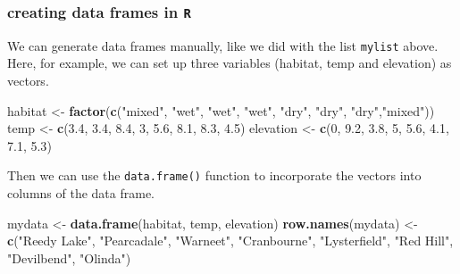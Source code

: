 \documentclass[]{book}
\newenvironment{Shaded}{\begin{snugshade}}{\end{snugshade}}
\newcommand{\DecValTok}[1]{\textcolor[rgb]{0.00,0.00,0.81}{#1}}
\newcommand{\FloatTok}[1]{\textcolor[rgb]{0.00,0.00,0.81}{#1}}
\newcommand{\KeywordTok}[1]{\textcolor[rgb]{0.13,0.29,0.53}{\textbf{#1}}}
\newcommand{\NormalTok}[1]{#1}
\newcommand{\StringTok}[1]{\textcolor[rgb]{0.31,0.60,0.02}{#1}}
\begin{document}
\hypertarget{creating-data-frames-in-r}{%
\subsubsection{\texorpdfstring{creating data frames in \texttt{R}}{creating data frames in R}}\label{creating-data-frames-in-r}}

We can generate data frames manually, like we did with the list \texttt{mylist} above. Here, for example, we can set up three variables (habitat, temp and elevation) as vectors.

\begin{Shaded}
\begin{Highlighting}[]
\NormalTok{habitat <-}\StringTok{ }\KeywordTok{factor}\NormalTok{(}\KeywordTok{c}\NormalTok{(}\StringTok{"mixed"}\NormalTok{, }\StringTok{"wet"}\NormalTok{, }\StringTok{"wet"}\NormalTok{, }\StringTok{"wet"}\NormalTok{, }\StringTok{"dry"}\NormalTok{, }\StringTok{"dry"}\NormalTok{, }\StringTok{"dry"}\NormalTok{,}\StringTok{"mixed"}\NormalTok{))}
\NormalTok{temp <-}\StringTok{ }\KeywordTok{c}\NormalTok{(}\FloatTok{3.4}\NormalTok{, }\FloatTok{3.4}\NormalTok{, }\FloatTok{8.4}\NormalTok{, }\DecValTok{3}\NormalTok{, }\FloatTok{5.6}\NormalTok{, }\FloatTok{8.1}\NormalTok{, }\FloatTok{8.3}\NormalTok{, }\FloatTok{4.5}\NormalTok{)}
\NormalTok{elevation <-}\StringTok{ }\KeywordTok{c}\NormalTok{(}\DecValTok{0}\NormalTok{, }\FloatTok{9.2}\NormalTok{, }\FloatTok{3.8}\NormalTok{, }\DecValTok{5}\NormalTok{, }\FloatTok{5.6}\NormalTok{, }\FloatTok{4.1}\NormalTok{, }\FloatTok{7.1}\NormalTok{, }\FloatTok{5.3}\NormalTok{)}
\end{Highlighting}
\end{Shaded}

Then we can use the \texttt{data.frame()} function to incorporate the vectors into columns of the data frame.

\begin{Shaded}
\begin{Highlighting}[]
\NormalTok{mydata <-}\StringTok{ }\KeywordTok{data.frame}\NormalTok{(habitat, temp, elevation)}
\KeywordTok{row.names}\NormalTok{(mydata) <-}\StringTok{ }\KeywordTok{c}\NormalTok{(}\StringTok{"Reedy Lake"}\NormalTok{, }\StringTok{"Pearcadale"}\NormalTok{, }\StringTok{"Warneet"}\NormalTok{, }\StringTok{"Cranbourne"}\NormalTok{, }
                       \StringTok{"Lysterfield"}\NormalTok{, }\StringTok{"Red Hill"}\NormalTok{, }\StringTok{"Devilbend"}\NormalTok{, }\StringTok{"Olinda"}\NormalTok{)}
\end{Highlighting}
\end{Shaded}
\end{document}
